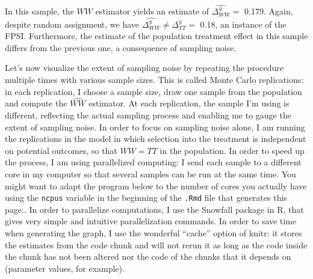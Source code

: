 \documentclass[]{book}
\theoremstyle{definition}
\theoremstyle{definition}
\theoremstyle{definition}
\theoremstyle{remark}
\begin{document}
In this sample, the \(WW\) estimator yields an estimate of \(\hat{\Delta^y_{WW}}=\) 0.179.
Again, despite random assignment, we have \(\hat{\Delta^y_{WW}}\neq\Delta^y_{TT}=\) 0.18, an instance of the FPSI.
Furthermore, the estimate of the population treatment effect in this sample differs from the previous one, a consequence of sampling noise.

Let's now visualize the extent of sampling noise by repeating the procedure multiple times with various sample sizes.
This is called Monte Carlo replications: in each replication, I choose a sample size, draw one sample from the population and compute the \(\hat{WW}\) estimator.
At each replication, the sample I'm using is different, reflecting the actual sampling process and enabling me to gauge the extent of sampling noise.
In order to focus on sampling noise alone, I am running the replications in the model in which selection into the treatment is independent on potential outcomes, so that \(WW=TT\) in the population.
In order to speed up the process, I am using parallelized computing: I send each sample to a different core in my computer so that several samples can be run at the same time.
You might want to adapt the program below to the number of cores you actually have using the \texttt{ncpus} variable in the beginning of the \texttt{.Rmd} file that generates this page..
In order to parallelize computations, I use the Snowfall package in R, that gives very simple and intuitive parallelization commands.
In order to save time when generating the graph, I use the wonderful ``cache'' option of knitr: it stores the estimates from the code chunk and will not rerun it as long as the code inside the chunk has not been altered nor the code of the chunks that it depends on (parameter values, for example).
\end{document}
